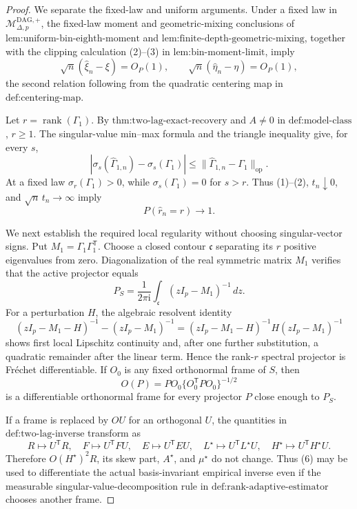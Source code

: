 \documentclass{article}
\begin{document}
\begin{proof}
We separate the fixed-law and uniform arguments.  Under a fixed law in \(\mathcal M_{\Delta,p}^{\mathrm{DAG},+}\), the fixed-law moment and geometric-mixing conclusions of \(\text{lem:uniform-bin-eighth-moment}\) and \(\text{lem:finite-depth-geometric-mixing}\), together with the clipping calculation (2)--(3) in \(\text{lem:bin-moment-limit}\), imply
\[
 \sqrt n(\widehat\xi_n-\xi)=O_P(1),
 \qquad
 \sqrt n(\widehat\eta_n-\eta)=O_P(1),
\tag{1}
\]
the second relation following from the quadratic centering map in \(\text{def:centering-map}\).

Let \(r=\operatorname{rank}(\Gamma_1)\).  By \(\text{thm:two-lag-exact-recovery}\) and \(A\neq0\) in \(\text{def:model-class}\), \(r\geq1\).  The singular-value min--max formula and the triangle inequality give, for every \(s\),
\[
 |\sigma_s(\widehat\Gamma_{1,n})-\sigma_s(\Gamma_1)|
 \leq\lVert\widehat\Gamma_{1,n}-\Gamma_1\rVert_{\mathrm{op}}.
\tag{2}
\]
At a fixed law \(\sigma_r(\Gamma_1)>0\), while \(\sigma_s(\Gamma_1)=0\) for \(s>r\).  Thus (1)--(2), \(t_n\downarrow0\), and \(\sqrt n\,t_n\to\infty\) imply
\[
 P(\widehat r_n=r)\longrightarrow1.
\tag{3}
\]

We next establish the required local regularity without choosing singular-vector signs.  Put \(M_1=\Gamma_1\Gamma_1^{\mathsf T}\).  Choose a closed contour \(\mathfrak c\) separating its \(r\) positive eigenvalues from zero.  Diagonalization of the real symmetric matrix \(M_1\) verifies that the active projector equals
\[
 P_S=\frac{1}{2\pi\mathrm i}\int_{\mathfrak c}(zI_p-M_1)^{-1}\,dz.
\tag{4}
\]
For a perturbation \(H\), the algebraic resolvent identity
\[
 (zI_p-M_1-H)^{-1}-(zI_p-M_1)^{-1}
 =(zI_p-M_1-H)^{-1}H(zI_p-M_1)^{-1}
\tag{5}
\]
shows first local Lipschitz continuity and, after one further substitution, a quadratic remainder after the linear term.  Hence the rank-\(r\) spectral projector is Fr\'{e}chet differentiable.  If \(O_0\) is any fixed orthonormal frame of \(S\), then
\[
 O(P)=PO_0\{O_0^{\mathsf T}PO_0\}^{-1/2}
\tag{6}
\]
is a differentiable orthonormal frame for every projector \(P\) close enough to \(P_S\).

If a frame is replaced by \(OU\) for an orthogonal \(U\), the quantities in \(\text{def:two-lag-inverse}\) transform as
\[
 R\mapsto U^{\mathsf T}R,\quad F\mapsto U^{\mathsf T}FU,\quad
 E\mapsto U^{\mathsf T}EU,\quad L^\star\mapsto U^{\mathsf T}L^\star U,\quad
 H^\star\mapsto U^{\mathsf T}H^\star U.
\tag{7}
\]
Therefore \(O(H^\star)^2R\), its skew part, \(A^\star\), and \(\mu^\star\) do not change.  Thus (6) may be used to differentiate the actual basis-invariant empirical inverse even if the measurable singular-value-decomposition rule in \(\text{def:rank-adaptive-estimator}\) chooses another frame.


\end{proof}
\end{document}

